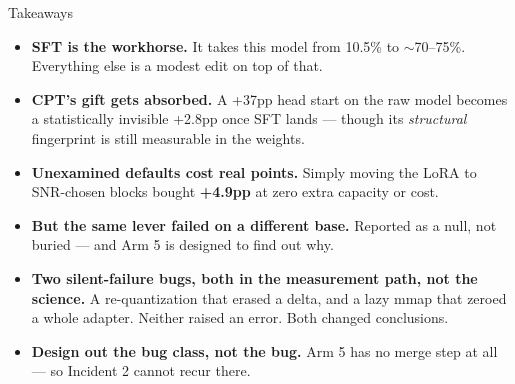\documentclass[aspectratio=169,11pt]{beamer}
\newcommand{\good}[1]{\textcolor{jsAccent}{\textbf{#1}}}
\begin{document}
\begin{frame}{Takeaways}
  \begin{itemize}
    \item \textbf{SFT is the workhorse.} It takes this model from 10.5\% to $\sim$70--75\%. Everything else is a modest edit on top of that.
    \item \textbf{CPT's gift gets absorbed.} A +37pp head start on the raw model becomes a statistically invisible +2.8pp once SFT lands --- though its \emph{structural} fingerprint is still measurable in the weights.
    \item \textbf{Unexamined defaults cost real points.} Simply moving the LoRA to SNR-chosen blocks bought \good{+4.9pp} at zero extra capacity or cost.
    \item \textbf{But the same lever failed on a different base.} Reported as a null, not buried --- and Arm 5 is designed to find out why.
    \item \textbf{Two silent-failure bugs, both in the measurement path, not the science.} A re-quantization that erased a delta, and a lazy mmap that zeroed a whole adapter. Neither raised an error. Both changed conclusions.
    \item \textbf{Design out the bug class, not the bug.} Arm 5 has no merge step at all --- so Incident 2 cannot recur there.
  \end{itemize}
\end{frame}
\end{document}
